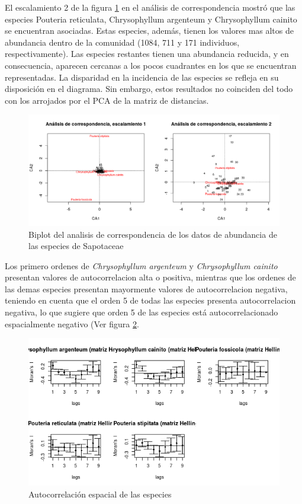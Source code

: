 \documentclass[11pt,]{article}
\begin{document}
El escalamiento 2 de la figura \ref{fig:Analisis_de_correspondencia} en
el análisis de correspondencia mostró que las especies Pouteria
reticulata, Chrysophyllum argenteum y Chrysophyllum cainito se
encuentran asociadas. Estas especies, además, tienen los valores mas
altos de abundancia dentro de la comunidad (1084, 711 y 171 individuos,
respectivamente). Las especies restantes tienen una abundancia reducida,
y en consecuencia, aparecen cercanas a los pocos cuadrantes en los que
se encuentran representadas. La disparidad en la incidencia de las
especies se refleja en su disposición en el diagrama. Sin embargo, estos
resultados no coinciden del todo con los arrojados por el PCA de la
matriz de distancias.

\begin{figure}
\centering
\includegraphics[width=1.00000\textwidth]{analisis_de_correspondencia_actualizado.png}
\caption{Biplot del analisis de correspondencia de los datos de
abundancia de las especies de Sapotaceae
\label{fig:Analisis_de_correspondencia}}
\end{figure}

Los primero ordenes de \emph{Chrysophyllum argenteum} y
\emph{Chrysophyllum cainito} presentan valores de autocorrelacion alta o
positiva, mientras que los ordenes de las demas especies presentan
mayormente valores de autocorrelacion negativa, teniendo en cuenta que
el orden 5 de todas las especies presenta autocorrelacion negativa, lo
que sugiere que orden 5 de las especies está autocorrelacionado
espacialmente negativo (Ver figura \ref{fig:Abundancia_matriz}.

\begin{figure}
\centering
\includegraphics[width=1.00000\textwidth]{Abundancia_matriz.png}
\caption{Autocorrelación espacial de las especies
\label{fig:Abundancia_matriz}}
\end{figure}
\end{document}

